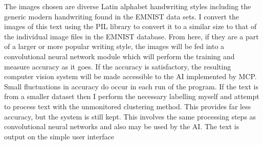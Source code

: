 \documentclass[12pt]{article}
\begin{document}
The images chosen are diverse Latin alphabet handwriting styles including the generic modern handwriting found in the EMNIST data sets. I convert the images of this text using the PIL library to convert it to a similar size to that of the individual image files in the EMNIST database. From here, if they are a part of a larger or more popular writing style, the images will be fed into a convolutional neural network module which will perform the training and measure accuracy as it goes. If the accuracy is satisfactory, the resulting computer vision system will be made accessible to the AI implemented by MCP. Small fluctuations in accuracy do occur in each run of the program. If the text is from a smaller dataset then I perform the necessary labelling myself and attempt to process text with the unmonitored clustering method. This provides far less accuracy, but the system is still kept. This involves the same processing steps as convolutional neural networks and also may be used by the AI. The text is output on the simple user interface 
\end{document}
